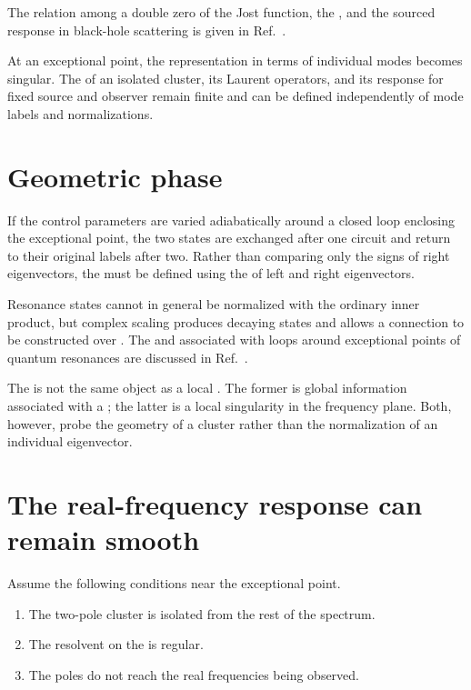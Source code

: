 The relation among a double zero of the Jost function, the , and the sourced response in black-hole scattering is given in Ref.~\cite{Morikawa:2026RieszLaurent}.

\begin{principlebox}
At an exceptional point, the representation in terms of individual modes becomes singular. The  of an isolated cluster, its Laurent operators, and its response for fixed source and observer remain finite and can be defined independently of mode labels and normalizations.
\end{principlebox}

\section{Geometric phase}

If the control parameters are varied adiabatically around a closed loop enclosing the exceptional point, the two states are exchanged after one circuit and return to their original labels after two. Rather than comparing only the signs of right eigenvectors, the  must be defined using the  of left and right eigenvectors.

Resonance states cannot in general be normalized with the ordinary inner product, but complex scaling produces decaying states and allows a connection to be constructed over . The  and  associated with loops around exceptional points of quantum resonances are discussed in Ref.~\cite{Morikawa:2025inx}.

The  is not the same object as a local . The former is global information associated with a ; the latter is a local singularity in the frequency plane. Both, however, probe the geometry of a cluster rather than the normalization of an individual eigenvector.

\section{The real-frequency response can remain smooth}

Assume the following conditions near the exceptional point.

\begin{enumerate}[label=(\roman*),leftmargin=2.8em]
\item The two-pole cluster is isolated from the rest of the spectrum.
\item The resolvent on the  is regular.
\item The poles do not reach the real frequencies being observed.
\end{enumerate}

